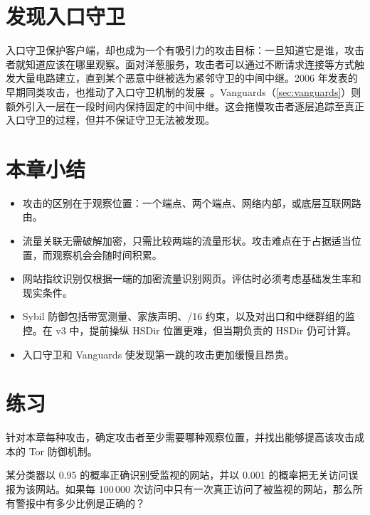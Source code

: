 \section{发现入口守卫}\label{sec:att-guard}

入口守卫保护客户端，却也成为一个有吸引力的攻击目标：一旦知道它是谁，攻击者就知道应该在哪里观察。面对洋葱服务，攻击者可以通过不断请求连接等方式触发大量电路建立，直到某个恶意中继被选为紧邻守卫的中间中继。2006 年发表的早期同类攻击，也推动了入口守卫机制的发展~\cite{overlier2006locating}。Vanguards（\cref{sec:vanguards}）则额外引入一层在一段时间内保持固定的中间中继。这会拖慢攻击者逐层追踪至真正入口守卫的过程，但并不保证守卫无法被发现。

\section*{本章小结}
\begin{itemize}
  \item 攻击的区别在于观察位置：一个端点、两个端点、网络内部，或底层互联网路由。
  \item 流量关联无需破解加密，只需比较两端的流量形状。攻击难点在于占据适当位置，而观察机会会随时间积累。
  \item 网站指纹识别仅根据一端的加密流量识别网页。评估时必须考虑基础发生率和现实条件。
  \item Sybil 防御包括带宽测量、家族声明、/16 约束，以及对出口和中继群组的监控。在 v3 中，提前操纵 HSDir 位置更难，但当期负责的 HSDir 仍可计算。
  \item 入口守卫和 Vanguards 使发现第一跳的攻击更加缓慢且昂贵。
\end{itemize}

\section*{练习}

\begin{esercizio}[1]\label{es:26-posizione}
针对本章每种攻击，确定攻击者至少需要哪种观察位置，并找出能够提高该攻击成本的 Tor 防御机制。
\end{esercizio}

\begin{esercizio}[1]\label{es:26-base}
某分类器以 0.95 的概率正确识别受监视的网站，并以 0.001 的概率把无关访问误报为该网站。如果每 100\,000 次访问中只有一次真正访问了被监视的网站，那么所有警报中有多少比例是正确的？
\end{esercizio}

